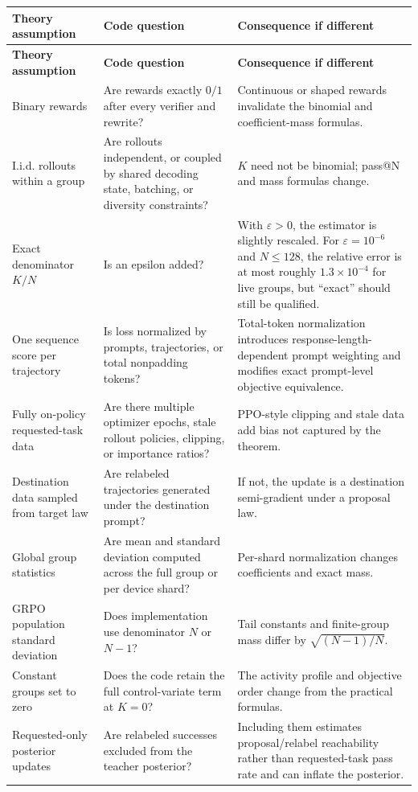 \documentclass[11pt]{article}
\theoremstyle{definition}
\theoremstyle{remark}
\begin{document}
\small
\begin{longtable}{p{}p{}p{}}
\toprule
\textbf{Theory assumption} & \textbf{Code question} & \textbf{Consequence if different}\\
\midrule
\endfirsthead
\toprule
\textbf{Theory assumption} & \textbf{Code question} & \textbf{Consequence if different}\\
\midrule
\endhead
Binary rewards & Are rewards exactly $0/1$ after every verifier and rewrite? & Continuous or shaped rewards invalidate the binomial and coefficient-mass formulas.\\
I.i.d. rollouts within a group & Are rollouts independent, or coupled by shared decoding state, batching, or diversity constraints? & $K$ need not be binomial; pass@N and mass formulas change.\\
Exact denominator $K/N$ & Is an epsilon added? & With $\varepsilon>0$, the estimator is slightly rescaled. For $\varepsilon=10^{-6}$ and $N\le128$, the relative error is at most roughly $1.3\times10^{-4}$ for live groups, but ``exact'' should still be qualified.\\
One sequence score per trajectory & Is loss normalized by prompts, trajectories, or total nonpadding tokens? & Total-token normalization introduces response-length-dependent prompt weighting and modifies exact prompt-level objective equivalence.\\
Fully on-policy requested-task data & Are there multiple optimizer epochs, stale rollout policies, clipping, or importance ratios? & PPO-style clipping and stale data add bias not captured by the theorem.\\
Destination data sampled from target law & Are relabeled trajectories generated under the destination prompt? & If not, the update is a destination semi-gradient under a proposal law.\\
Global group statistics & Are mean and standard deviation computed across the full group or per device shard? & Per-shard normalization changes coefficients and exact mass.\\
GRPO population standard deviation & Does implementation use denominator $N$ or $N-1$? & Tail constants and finite-group mass differ by $\sqrt{(N-1)/N}$.\\
Constant groups set to zero & Does the code retain the full control-variate term at $K=0$? & The activity profile and objective order change from the practical formulas.\\
Requested-only posterior updates & Are relabeled successes excluded from the teacher posterior? & Including them estimates proposal/relabel reachability rather than requested-task pass rate and can inflate the posterior.\\
\bottomrule
\end{longtable}
\normalsize
\end{document}

